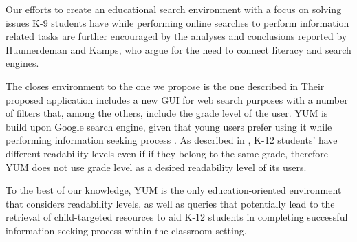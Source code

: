 \documentclass{sig-alternate-05-2015}
\begin{document}
 Our efforts to create an educational search environment with a focus on solving issues K-9 students have while performing online searches to perform information related tasks are further encouraged by the analyses and conclusions reported by Huumerdeman and Kamps\cite{Huu15}, who argue for the need to connect literacy and search engines.


 

The closes environment to the one we propose is the one described in \cite{Ust14} Their proposed application includes a new GUI for web search purposes with a number of filters that, among the others, include the grade level of the user.  YUM is build upon Google search engine, given that young users prefer using it while performing information seeking process \cite{Bil13}. As described in \cite{Bow92}, K-12 students' have different readability levels even if if they belong to the same grade, therefore YUM does not use grade level as a desired readability level of its users.

To the best of our knowledge, YUM is the only education-oriented environment that considers readability levels, as well as queries that potentially lead to the retrieval of child-targeted resources to aid K-12 students in completing successful information seeking process within the classroom setting.
\end{document}
